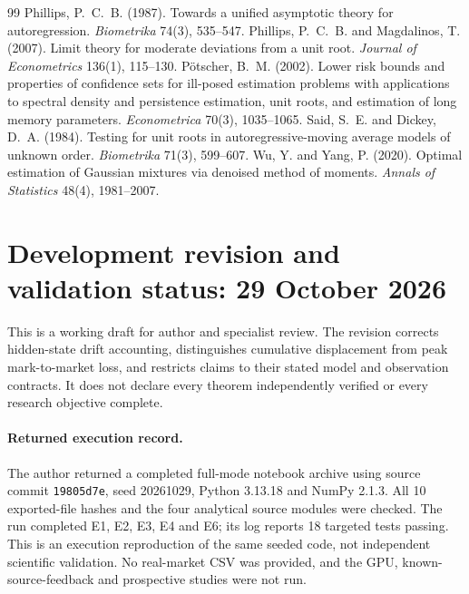 \documentclass[12pt]{article}
\theoremstyle{definition}
\theoremstyle{remark}
\begin{document}
\begin{thebibliography}{99}
 Phillips, P.~C.~B. (1987). Towards a unified asymptotic theory for autoregression. \emph{Biometrika} 74(3), 535--547.
 Phillips, P.~C.~B. and Magdalinos, T. (2007). Limit theory for moderate deviations from a unit root. \emph{Journal of Econometrics} 136(1), 115--130.
 P\"otscher, B.~M. (2002). Lower risk bounds and properties of confidence sets for ill-posed estimation problems with applications to spectral density and persistence estimation, unit roots, and estimation of long memory parameters. \emph{Econometrica} 70(3), 1035--1065.
 Said, S.~E. and Dickey, D.~A. (1984). Testing for unit roots in autoregressive-moving average models of unknown order. \emph{Biometrika} 71(3), 599--607.
 Wu, Y. and Yang, P. (2020). Optimal estimation of Gaussian mixtures via denoised method of moments. \emph{Annals of Statistics} 48(4), 1981--2007.
\end{thebibliography}



\section*{Development revision and validation status: 29 October 2026}
This is a working draft for author and specialist review. The revision corrects
hidden-state drift accounting, distinguishes cumulative displacement from peak
mark-to-market loss, and restricts claims to their stated model and observation
contracts. It does not declare every theorem independently verified or every
research objective complete.

\paragraph{Returned execution record.} The author returned a completed full-mode
notebook archive using source commit \texttt{19805d7e}, seed 20261029,
Python 3.13.18 and NumPy 2.1.3. All 10 exported-file hashes and the four analytical
source modules were checked. The run completed E1, E2, E3, E4 and E6; its log
reports 18 targeted tests passing. This is an execution reproduction of the same
seeded code, not independent scientific validation. No real-market CSV was
provided, and the GPU, known-source-feedback and prospective studies were not run.
\end{document}
